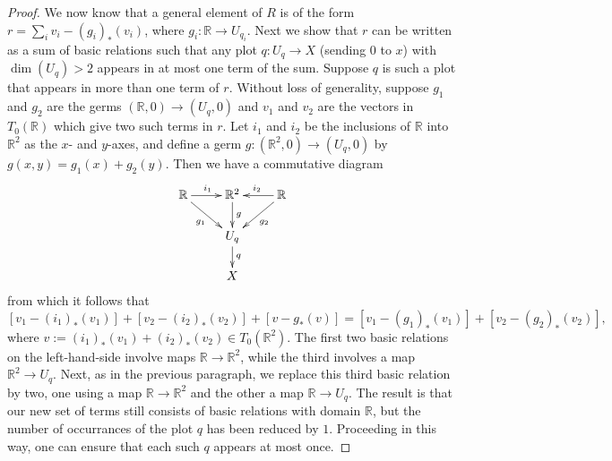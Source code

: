 \documentclass{amsart}
\theoremstyle{remark}
\def \R{\mathbb{R}}
\begin{document}
\begin{proof}
We now know that a general element of $R$ is of the form
$r = \sum_i v_i - (g_i)_*(v_i)$, where $g_i : \R \to U_{q_i}$.
Next we show that $r$ can be written as a sum of basic
relations such that any plot $q : U_q \to X$ (sending $0$ to $x$) with
$\dim(U_q) > 2$ appears in at most one term of the sum.
Suppose $q$ is such a plot that appears in more than one term of $r$.
Without loss of generality, suppose $g_1$ and $g_2$ are the germs $(\R,0) \to (U_q,0)$
and $v_1$ and $v_2$ are the vectors in $T_0(\R)$ which give two such terms in $r$.
Let $i_1$ and $i_2$ be the inclusions of $\R$ into $\R^2$ as the $x$- and $y$-axes,
and define a germ $g : (\R^2,0) \to (U_q,0)$ by $g(x,y) = g_1(x) + g_2(y)$.
%
Then we have a commutative diagram
\[
  \xymatrix@R-6pt{ \R \ar[r]^{i_1} \ar[dr]_{g_1} & \R^2 \ar[d]^-g & \R \ar[l]_{i_2} \ar[dl]^{g_2} \\
                                                 &  U_q \ar[d]^q \\
                                                 &  X }
\]
from which it follows that
\[
  [ v_1 - (i_1)_*(v_1) ] + [ v_2 - (i_2)_*(v_2) ] + [ v - g_*(v) ] = [ v_1 - (g_1)_*(v_1) ] + [ v_2 - (g_2)_*(v_2) ] ,
\]
where $v := (i_1)_*(v_1) + (i_2)_*(v_2) \in T_0(\R^2)$.
The first two basic relations on the left-hand-side involve maps $\R \to \R^2$,
while the third involves a map $\R^2 \to U_q$.
Next, as in the previous paragraph, we replace this third basic relation
by two, one using a map $\R \to \R^2$ and the other a map $\R \to U_q$.
The result is that our new set of terms still consists of basic relations
with domain $\R$, but the number of occurrances of the plot $q$ has
been reduced by $1$.
Proceeding in this way, one can ensure that each such $q$ appears at
most once.


\end{proof}
\end{document}
